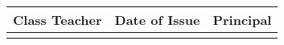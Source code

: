 \documentclass[a4paper,11pt]{article}
\begin{document}
\vspace{0.3cm}

\begin{center}
\begin{tabularx}{\textwidth}{|X|X|X|}
\hline
\rowcolor{lightgray}
\textbf{Class Teacher} & \textbf{Date of Issue} & \textbf{Principal} \\
\hline
\rule{0pt}{2cm} & \rule{0pt}{2cm} & \rule{0pt}{2cm} \\
\hline
\end{tabularx}
\end{center}

\vspace{0.2cm}

\begin{center}
\end{center}
\end{document}
